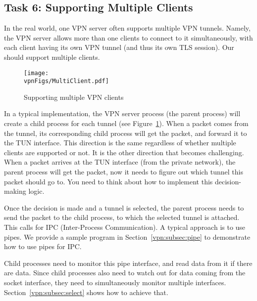 \subsection{Task 6: Supporting Multiple Clients}


In the real world, one VPN server often supports multiple VPN tunnels. 
Namely, the VPN server allows more than one clients to 
connect to it simultaneously, with each client having its own VPN tunnel (and thus
its own TLS session). Our \miniVPN should support 
multiple clients. 


\begin{figure}[htb]
\begin{center}
\texttt{[image: \\vpnFigs/MultiClient.pdf]}
\end{center}
\caption{Supporting multiple VPN clients}
\label{vpn:fig:MultiClient}
\end{figure}
 

In a typical implementation, the VPN server process (the parent
process) will create a child process for each tunnel (see  
Figure~\ref{vpn:fig:MultiClient}).
When a packet comes from the tunnel, its corresponding child process 
will get the packet, and forward it to the TUN interface. 
This direction is the same regardless of whether multiple clients are 
supported or not. It is the other direction that becomes challenging. 
When a packet arrives at the TUN interface (from the private network), 
the parent process will get the packet, now it needs to figure out which
tunnel this packet should go to. You need to think about how to implement
this decision-making logic. 

Once the decision is made and a tunnel is selected, the parent process
needs to send the packet to the child process, to which
the selected tunnel is attached. This calls for IPC (Inter-Process Communication). A
typical approach is to use pipes. We provide a sample program in
Section~\ref{vpn:subsec:pipe} to demonstrate how to use pipes for IPC.


Child processes need to monitor this pipe interface, and read data from it if there 
are data. Since child processes also need to watch out for data coming from the socket
interface, they need to simultaneously monitor multiple interfaces.    
Section~\ref{vpn:subsec:select} shows how to achieve that. 




